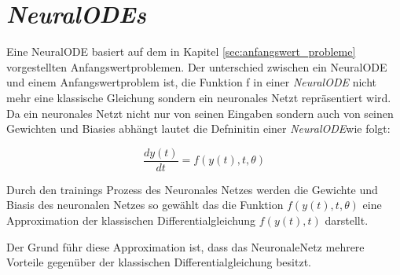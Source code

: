 
\section{\textit{NeuralODEs}} \label{sec:neural_ode}

Eine NeuralODE \cite{neuralode} basiert auf dem in Kapitel \ref{sec:anfangswert_probleme} vorgestellten Anfangswertproblemen.
Der unterschied zwischen ein NeuralODE und einem Anfangswertproblem ist, 
die Funktion f in einer \textit{NeuralODE} nicht mehr eine klassische Gleichung sondern ein 
neuronales Netzt repräsentiert wird.
Da ein neuronales Netzt nicht nur von seinen Eingaben sondern auch von seinen Gewichten und Biasies abhängt
lautet die Defninitin einer \textit{NeuralODE}wie folgt:

$$
\frac{d y(t)}{dt} = f(y(t), t, \theta)
$$

Durch den trainings Prozess des Neuronales Netzes werden die Gewichte und Biasis des neuronalen Netzes 
so gewählt das die Funktion $f(y(t), t, \theta)$ eine Approximation der klassischen Differentialgleichung 
$f(y(t), t)$ darstellt.

Der Grund führ diese Approximation ist, dass das NeuronaleNetz mehrere Vorteile gegenüber der klassischen Differentialgleichung besitzt.







